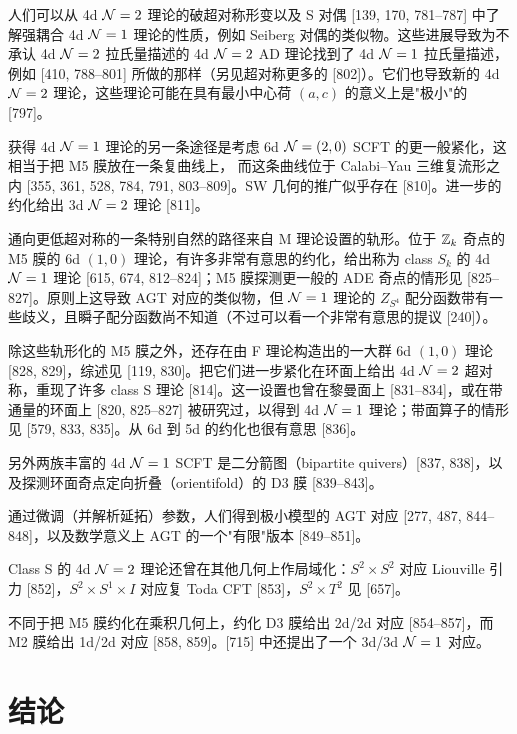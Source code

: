 人们可以从 4d $\mathcal{N}=2$ 理论的破超对称形变以及 S 对偶 [139, 170, 781--787] 中了解强耦合 4d $\mathcal{N}=1$ 理论的性质，例如 Seiberg 对偶的类似物。这些进展导致为不承认 4d $\mathcal{N}=2$ 拉氏量描述的 4d $\mathcal{N}=2$ AD 理论找到了 4d $\mathcal{N}=1$ 拉氏量描述，例如 [410, 788--801] 所做的那样（另见超对称更多的 [802]）。它们也导致新的 4d $\mathcal{N}=2$ 理论，这些理论可能在具有最小中心荷 $(a,c)$ 的意义上是"极小"的 [797]。

获得 4d $\mathcal{N}=1$ 理论的另一条途径是考虑 6d $\mathcal{N}=(2,0)$ SCFT 的更一般紧化，这相当于把 M5 膜放在一条复曲线上，
而这条曲线位于 Calabi--Yau 三维复流形之内 [355, 361, 528, 784, 791, 803--809]。SW 几何的推广似乎存在 [810]。进一步的约化给出 3d $\mathcal{N}=2$ 理论 [811]。

通向更低超对称的一条特别自然的路径来自 M 理论设置的轨形。位于 $\mathbb{Z}_k$ 奇点的 M5 膜的 6d $(1,0)$ 理论，有许多非常有意思的约化，给出称为 class $S_k$ 的 4d $\mathcal{N}=1$ 理论 [615, 674, 812--824]；M5 膜探测更一般的 ADE 奇点的情形见 [825--827]。原则上这导致 AGT 对应的类似物，但 $\mathcal{N}=1$ 理论的 $Z_{S^4}$ 配分函数带有一些歧义，且瞬子配分函数尚不知道（不过可以看一个非常有意思的提议 [240]）。

除这些轨形化的 M5 膜之外，还存在由 F 理论构造出的一大群 6d $(1,0)$ 理论 [828, 829]，综述见 [119, 830]。把它们进一步紧化在环面上给出 4d $\mathcal{N}=2$ 超对称，重现了许多 class S 理论 [814]。这一设置也曾在黎曼面上 [831--834]，或在带通量的环面上 [820, 825--827] 被研究过，以得到 4d $\mathcal{N}=1$ 理论；带面算子的情形见 [579, 833, 835]。从 6d 到 5d 的约化也很有意思 [836]。

另外两族丰富的 4d $\mathcal{N}=1$ SCFT 是二分箭图（bipartite quivers）[837, 838]，以及探测环面奇点定向折叠（orientifold）的 D3 膜 [839--843]。

通过微调（并解析延拓）参数，人们得到极小模型的 AGT 对应 [277, 487, 844--848]，以及数学意义上 AGT 的一个"有限"版本 [849--851]。

Class S 的 4d $\mathcal{N}=2$ 理论还曾在其他几何上作局域化：$S^2\times S^2$ 对应 Liouville 引力 [852]，$S^2\times S^1\times I$ 对应复 Toda CFT [853]，$S^2\times T^2$ 见 [657]。

不同于把 M5 膜约化在乘积几何上，约化 D3 膜给出 2d/2d 对应 [854--857]，而 M2 膜给出 1d/2d 对应 [858, 859]。[715] 中还提出了一个 3d/3d $\mathcal{N}=1$ 对应。

\section{结论}

